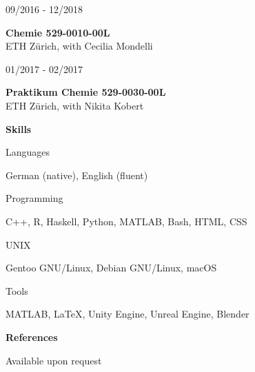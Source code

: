 \documentclass{article}
\newcommand{\cventry}[3]{
  \begin{minipage}[t]{.24\linewidth}
    \begin{flushright}
      #1
    \end{flushright}
  \end{minipage}
  \hspace{\fill}
  \begin{minipage}[t]{.70\linewidth}
    \textbf{#2}\\
    #3 
  \end{minipage}
  \vspace{1.5em}
}
\newcommand{\skillentry}[2]{
  \begin{minipage}[t]{.24\linewidth}
    \begin{flushright}
      #1
    \end{flushright}
  \end{minipage}
  \hspace{\fill}
  \begin{minipage}[t]{.70\linewidth}
    #2
  \end{minipage}
  \vspace{1.5em}
}
\renewcommand{\section}[1]{
  \vspace{2em}

  \begin{minipage}[t]{.24\linewidth}
  \end{minipage}
  \hspace{\fill}
  \begin{minipage}[t]{.70\linewidth}
    {\raggedright \bfseries \Large#1}
  \end{minipage}
  \vspace{1.5em}
}
\begin{document}
\cventry{09/2016 - 12/2018}
        {Chemie 529-0010-00L}        
        {ETH Z\"urich, with Cecilia Mondelli}

\cventry{01/2017 - 02/2017}        
        {Praktikum Chemie 529-0030-00L}        
        {ETH Z\"urich, with Nikita Kobert}


\section{Skills}

\skillentry{Languages}{German (native), English (fluent)}

\skillentry{Programming}{C++, R, Haskell, Python, MATLAB, Bash, HTML, CSS}

\skillentry{UNIX}{Gentoo GNU/Linux, Debian GNU/Linux, macOS}

\skillentry{Tools}{MATLAB, \LaTeX, Unity Engine, Unreal Engine, Blender}


\section{References}

\skillentry{\quad}{Available upon request}
\end{document}
